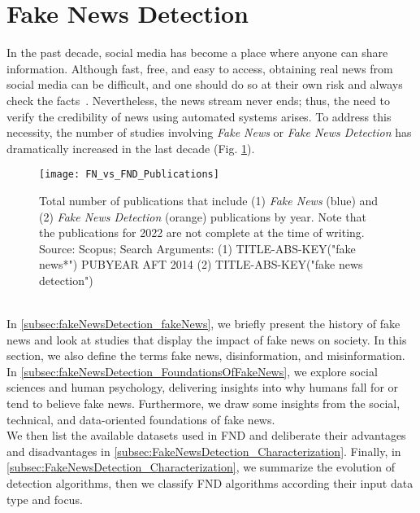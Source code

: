 \section{Fake News Detection}
\label{sec:fakeNewsDetection}
In the past decade, social media has become a place where anyone can share information. Although fast, free, and easy to access, obtaining real news from social media can be difficult, and one should do so at their own risk and always check the facts~\parencite{SocialMediaAndFakeNewsIn2016Election_Allcott,TheScienceOfFakeNews_Lazer}. Nevertheless, the news stream never ends; thus, the need to verify the credibility of news using automated systems arises. To address this necessity, the number of studies involving \emph{Fake News} or \emph{Fake News Detection} has dramatically increased in the last decade (Fig. \ref{fig:FN_vs_FND_Publications}).
\begin{figure}
    \centering
    \texttt{[image: FN\_vs\_FND\_Publications]}
    \caption[Fake News and Fake News Detection Publications by Year.]{Total number of publications that include (1) \emph{Fake News} (blue) and (2) \emph{Fake News Detection} (orange) publications by year. Note that the publications for 2022 are not complete at the time of writing. Source: Scopus; Search Arguments: (1) TITLE-ABS-KEY("fake news*") PUBYEAR AFT 2014 (2) TITLE-ABS-KEY("fake news detection")}\label{fig:FN_vs_FND_Publications}
\end{figure}\\
In \ref{subsec:fakeNewsDetection_fakeNews}, we briefly present the history of fake news and look at studies that display the impact of fake news on society. In this section, we also define the terms fake news, disinformation, and misinformation. \\
In \ref{subsec:fakeNewsDetection_FoundationsOfFakeNews}, we explore social sciences and human psychology, delivering insights into why humans fall for or tend to believe fake news. Furthermore, we draw some insights from the social, technical, and data-oriented foundations of fake news.\\
We then list the available datasets used in FND and deliberate their advantages and disadvantages in \ref{subsec:FakeNewsDetection_Characterization}. Finally, in \ref{subsec:FakeNewsDetection_Characterization}, we summarize the evolution of detection algorithms, then we classify FND algorithms according their input data type and focus.

